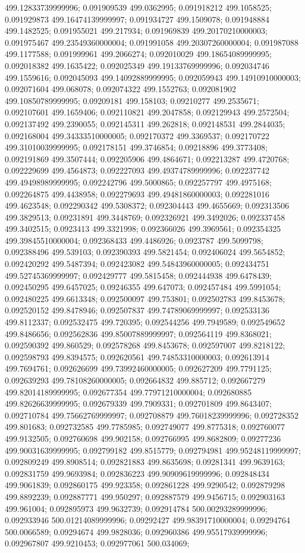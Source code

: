 499.12833739999996; 0.091909539 499.0362995; 0.091918212 499.1058525; 0.091929873 499.16474139999997; 0.091934727 499.1509078; 0.091948884 499.1482525; 0.091955021 499.217934; 0.091969839 499.20170210000003; 0.091975467 499.23549360000004; 0.091991058 499.20307260000004; 0.091987088 499.1177588; 0.091999961 499.2066274; 0.092010029 499.18654089999995; 0.092018382 499.1635422; 0.092025349 499.19133769999996; 0.092034746 499.1559616; 0.092045093 499.14092889999995; 0.092059943 499.14910910000003; 0.092071604 499.068078; 0.092074322 499.1552763; 0.092081902 499.10850789999995; 0.09209181 499.158103; 0.09210277 499.2535671; 0.092107601 499.1659406; 0.092110821 499.2047858; 0.092129943 499.2572504; 0.092137492 499.2390055; 0.092145311 499.262818; 0.092148531 499.2844035; 0.092168004 499.34333510000005; 0.092170372 499.3369537; 0.092170722 499.31010039999995; 0.092178151 499.3746854; 0.09218896 499.3773408; 0.092191869 499.3507444; 0.092205906 499.4864671; 0.092213287 499.4720768; 0.092229699 499.4564873; 0.092227093 499.49374789999996; 0.092237742 499.49498989999995; 0.092242796 499.5000865; 0.092257797 499.4975168; 0.092264875 499.4438958; 0.092279693 499.49481860000003; 0.092281016 499.4623548; 0.092290342 499.5308372; 0.092304443 499.4655669; 0.092313506 499.3829513; 0.09231891 499.3448769; 0.092326921 499.3492026; 0.092337458 499.3402515; 0.0923413 499.3321998; 0.092366026 499.3969561; 0.092354325 499.39845510000004; 0.092368433 499.4486926; 0.0923787 499.5099798; 0.092388496 499.539103; 0.092390393 499.5821454; 0.092406024 499.5654852; 0.092420292 499.5487394; 0.092423082 499.54843960000005; 0.092434751 499.52745369999997; 0.092429777 499.5815458; 0.092444938 499.6478439; 0.092450295 499.6457025; 0.09246355 499.647073; 0.092457484 499.5991054; 0.092480225 499.6613348; 0.092500097 499.753801; 0.092502783 499.8453678; 0.092520152 499.8478946; 0.092507837 499.74789069999997; 0.092533136 499.8112337; 0.092532475 499.720395; 0.092544256 499.7949589; 0.092549652 499.8486656; 0.092562836 499.85007889999997; 0.092564119 499.8368021; 0.092590392 499.860529; 0.092578268 499.8453678; 0.092597007 499.8218122; 0.092598793 499.8394575; 0.092620561 499.74853310000003; 0.092613914 499.7694761; 0.092626699 499.73992460000005; 0.092627209 499.7791125; 0.092639293 499.78108260000005; 0.092664832 499.885712; 0.092667279 499.82014189999995; 0.092677354 499.77971210000004; 0.092680885 499.82626639999995; 0.092679339 499.7909331; 0.092701809 499.8643407; 0.092710784 499.75662769999997; 0.092708879 499.76018239999996; 0.092728352 499.801683; 0.092732585 499.7785985; 0.092749077 499.8775318; 0.092760077 499.9132505; 0.092760698 499.902158; 0.092766995 499.8682809; 0.09277236 499.90031639999995; 0.092799182 499.8515779; 0.092794981 499.95248119999997; 0.092809249 499.8908514; 0.092821883 499.8635698; 0.09281341 499.9639163; 0.092831759 499.9693984; 0.092836223 499.90909619999996; 0.092848434 499.9061839; 0.092860175 499.923358; 0.092861228 499.9290542; 0.092879298 499.8892239; 0.092887771 499.950297; 0.092887579 499.9456715; 0.092903163 499.961004; 0.092895973 499.9632739; 0.092914784 500.00293289999996; 0.092933946 500.01214089999996; 0.09292427 499.98391710000004; 0.09294764 500.0066589; 0.09294674 499.9828036; 0.092960386 499.95517939999996; 0.092967807 499.9210453; 0.092977061 500.034069; 